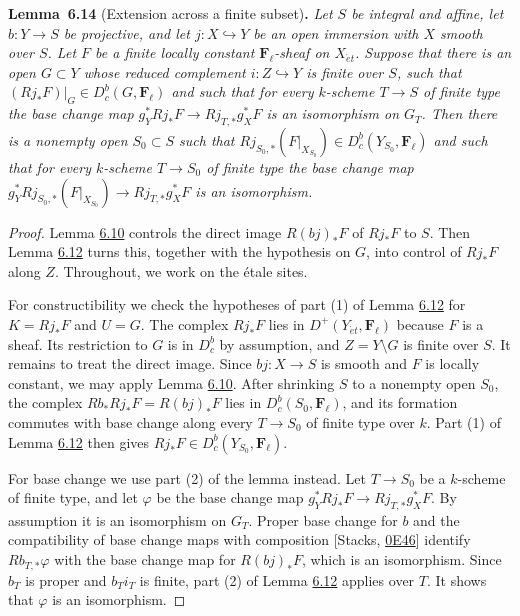 \documentclass[11pt]{article}
\newenvironment{bpstatement}[2]{\par\addvspace{0.6\baselineskip}\noindent\textbf{#1}#2\textbf{.}\enspace\ignorespaces}
  {\par\addvspace{0.4\baselineskip}}
\newenvironment{bpstatementit}[2]{\begin{bpstatement}{#1}{#2}\itshape\ignorespaces}{\end{bpstatement}}
\providecommand{\Dbc}{}\renewcommand{\Dbc}{D^b_c}
\providecommand{\Fell}{}\renewcommand{\Fell}{\mathbf F_\ell}
\begin{document}
\label{bp557}%
\begin{bpstatementit}{Lemma~6.14}{ (Extension across a finite subset)}
Let \(S\) be integral and affine, let \(b:Y\to S\) be projective, and let \(j:X\hookrightarrow Y\) be an open immersion with \(X\) smooth over \(S\). Let \(F\) be a finite locally constant \(\Fell\)-sheaf on \(X_{\acute{e}t}\). Suppose that there is an open \(G\subset Y\) whose reduced complement \(i:Z\hookrightarrow Y\) is finite over \(S\), such that \((Rj_*F)|_G\in\Dbc(G,\Fell)\) and such that for every \(k\)-scheme \(T\to S\) of finite type the base change map \(g_Y^*Rj_*F\to Rj_{T,*}g_X^*F\) is an isomorphism on \(G_T\). Then there is a nonempty open \(S_0\subset S\) such that \(Rj_{S_0,*}(F|_{X_{S_0}})\in\Dbc(Y_{S_0},\Fell)\) and such that for every \(k\)-scheme \(T\to S_0\) of finite type the base change map \(g_Y^*Rj_{S_0,*}(F|_{X_{S_0}})\to Rj_{T,*}g_X^*F\) is an isomorphism.
\end{bpstatementit}

\begin{proof}[{Proof}]\label{bp558}%
Lemma \hyperref[bp545]{6.10} controls the direct image \(R(bj)_*F\) of \(Rj_*F\) to \(S\). Then Lemma \hyperref[bp550]{6.12} turns this, together with the hypothesis on \(G\), into control of \(Rj_*F\) along \(Z\). Throughout, we work on the étale sites.

For constructibility we check the hypotheses of part (1) of Lemma \hyperref[bp550]{6.12} for \(K=Rj_*F\) and \(U=G\). The complex \(Rj_*F\) lies in \(D^+(Y_{\acute{e}t},\Fell)\) because \(F\) is a sheaf. Its restriction to \(G\) is in \(\Dbc\) by assumption, and \(Z=Y\setminus G\) is finite over \(S\). It remains to treat the direct image. Since \(bj:X\to S\) is smooth and \(F\) is locally constant, we may apply Lemma \hyperref[bp545]{6.10}. After shrinking \(S\) to a nonempty open \(S_0\), the complex \(Rb_*Rj_*F=R(bj)_*F\) lies in \(\Dbc(S_0,\Fell)\), and its formation commutes with base change along every \(T\to S_0\) of finite type over \(k\). Part (1) of Lemma \hyperref[bp550]{6.12} then gives \(Rj_*F\in\Dbc(Y_{S_0},\Fell)\).

For base change we use part (2) of the lemma instead. Let \(T\to S_0\) be a \(k\)-scheme of finite type, and let \(\varphi\) be the base change map \(g_Y^*Rj_*F\to Rj_{T,*}g_X^*F\). By assumption it is an isomorphism on \(G_T\). Proper base change for \(b\) and the compatibility of base change maps with composition [Stacks, \href{https://stacks.math.columbia.edu/tag/0E46}{0E46}] identify \(Rb_{T,*}\varphi\) with the base change map for \(R(bj)_*F\), which is an isomorphism. Since \(b_T\) is proper and \(b_Ti_T\) is finite, part (2) of Lemma \hyperref[bp550]{6.12} applies over \(T\). It shows that \(\varphi\) is an isomorphism.
\end{proof}
\end{document}
